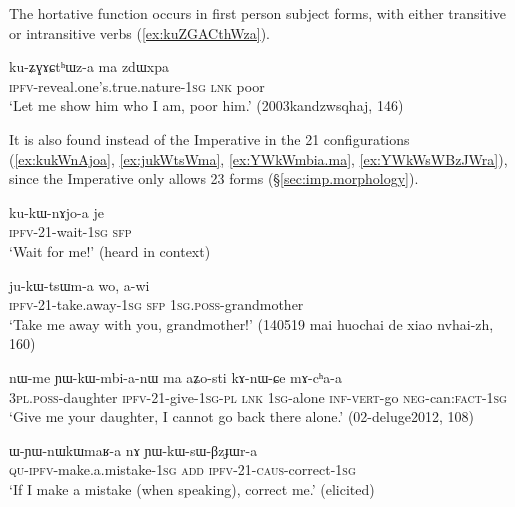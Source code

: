 The hortative function occurs in first person subject forms, with either transitive or intransitive verbs (\ref{ex:kuZGACthWza}).

\begin{exe}
\ex \label{ex:kuZGACthWza}
\gll ku-ʑɣɤɕtʰɯz-a ma zdɯxpa \\
\textsc{ipfv}-reveal.one's.true.nature-\textsc{1sg} \textsc{lnk} poor \\
\glt `Let me show him who I am, poor him.' (2003kandzwsqhaj, 146)
\end{exe}

It is also found instead of the Imperative in the 2\fl{}1 configurations (\ref{ex:kukWnAjoa}, \ref{ex:jukWtsWma}, \ref{ex:YWkWmbia.ma}, \ref{ex:YWkWsWBzJWra}), since the Imperative only allows 2\fl{}3 forms (§\ref{sec:imp.morphology}).

\begin{exe}
	\ex \label{ex:kukWnAjoa}
	\gll ku-kɯ-nɤjo-a je \\
	\textsc{ipfv}-2\fl{}1-wait-\textsc{1sg} \textsc{sfp}  \\
	\glt `Wait for me!' (heard in context)
\end{exe}

\begin{exe}
\ex \label{ex:jukWtsWma}
\gll ju-kɯ-tsɯm-a wo, a-wi \\
\textsc{ipfv}-2\fl{}1-take.away-\textsc{1sg} \textsc{sfp} \textsc{1sg}.\textsc{poss}-grandmother \\
\glt `Take me away with you, grandmother!' (140519 mai huochai de xiao nvhai-zh, 160)
\end{exe}

\begin{exe}
\ex \label{ex:YWkWmbia.ma}
\gll  nɯ-me ɲɯ-kɯ-mbi-a-nɯ ma aʑo-sti kɤ-nɯ-ɕe mɤ-cʰa-a \\
\textsc{3pl}.\textsc{poss}-daughter \textsc{ipfv}-2\fl{}1-give-\textsc{1sg}-\textsc{pl} \textsc{lnk} \textsc{1sg}-alone \textsc{inf}-\textsc{vert}-go \textsc{neg}-can:\textsc{fact}-\textsc{1sg} \\
\glt `Give me your daughter, I cannot go back there alone.' (02-deluge2012, 108)
\end{exe}

\begin{exe}
\ex \label{ex:YWkWsWBzJWra}
\gll ɯ-ɲɯ-nɯkɯmaʁ-a nɤ ɲɯ-kɯ-sɯ-βzɟɯr-a \\
\textsc{qu}-\textsc{ipfv}-make.a.mistake-\textsc{1sg} \textsc{add} \textsc{ipfv}-2\fl{}1-\textsc{caus}-correct-\textsc{1sg} \\
\glt `If I make a mistake (when speaking), correct me.' (elicited)
\end{exe}

